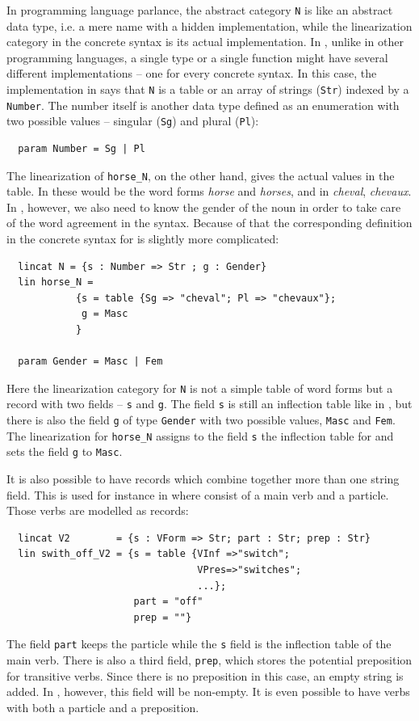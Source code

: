 \documentclass[output=paper]{langsci/langscibook}
\begin{document}
In programming language parlance, the abstract category \verb=N= 
is like an abstract data type, i.e. a mere name with 
a hidden implementation, while the linearization category in 
the concrete syntax is its actual implementation. 
In , unlike in other programming languages, a single type 
or a single function might have several different implementations -- 
one for every concrete syntax. In this case, the implementation in 
 says that \verb=N= is a table or an array of 
strings (\verb=Str=) indexed by a \verb=Number=. 
The number itself is another data type defined as an enumeration 
with two possible values -- singular (\verb=Sg=) and plural (\verb=Pl=):
\begin{verbatim}
  param Number = Sg | Pl
\end{verbatim}

The linearization of \verb=horse_N=, on the other hand, gives 
the actual values in the table. In  these would be 
the word forms \textit{horse} and \textit{horses}, and in 
 \textit{cheval}, \textit{chevaux}. In , however, we also need to 
know the gender of the noun in order to take care of 
the word agreement in the syntax. Because of that 
the corresponding definition in the concrete syntax for  is slightly
more complicated:
\begin{verbatim}
  lincat N = {s : Number => Str ; g : Gender}
  lin horse_N = 
            {s = table {Sg => "cheval"; Pl => "chevaux"};
             g = Masc
            }

  param Gender = Masc | Fem
\end{verbatim}
Here the linearization category for \verb=N= is not a simple table of 
word forms but a record with two fields -- \verb=s= and \verb=g=. 
The field \verb=s= is still an inflection table like in , 
but there is also the field \verb=g= of type \verb=Gender= with 
two possible values, \verb=Masc= and \verb=Fem=. The linearization 
for \verb=horse_N= assigns to the field \verb=s= the inflection table 
for  and sets the field \verb=g= to \verb=Masc=.

It is also possible to have records which combine together more than 
one string field. This is used for instance in  
where  consist of a main verb and a particle. 
Those verbs are modelled as records:
\begin{verbatim}
  lincat V2        = {s : VForm => Str; part : Str; prep : Str}
  lin swith_off_V2 = {s = table {VInf =>"switch";
                                 VPres=>"switches";
                                 ...};
                      part = "off"
                      prep = ""}
\end{verbatim}
The field \verb=part= keeps the particle while the \verb=s= field is the inflection table of the main verb. There is also a third field, \verb=prep=, which stores the potential preposition for transitive verbs. Since there is no preposition in this case, an empty string is added. In , however, this field will be non-empty. It is even possible to have verbs with both a particle and a preposition.
\end{document}
